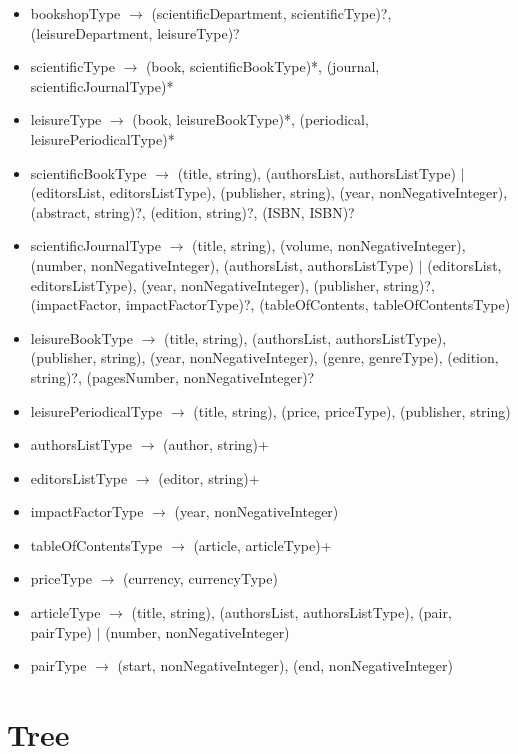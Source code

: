 \documentclass{article}
\begin{document}
\begin{itemize}
    \item bookshopType $\to$ (scientificDepartment, scientificType)?, (leisureDepartment, leisureType)?

    \item scientificType $\to$ (book, scientificBookType)*, (journal, scientificJournalType)*
    \item leisureType $\to$ (book, leisureBookType)*, (periodical, leisurePeriodicalType)*

    \item scientificBookType $\to$ (title, string), (authorsList, authorsListType) $|$ (editorsList, editorsListType), (publisher, string), (year, nonNegativeInteger), (abstract, string)?, (edition, string)?, (ISBN, ISBN)?
    \item scientificJournalType $\to$ (title, string), (volume, nonNegativeInteger), (number, nonNegativeInteger), (authorsList, authorsListType) $|$ (editorsList, editorsListType), (year, nonNegativeInteger), (publisher, string)?, (impactFactor, impactFactorType)?, (tableOfContents, tableOfContentsType)
    \item leisureBookType $\to$ (title, string), (authorsList, authorsListType), (publisher, string), (year, nonNegativeInteger), (genre, genreType), (edition, string)?, (pagesNumber, nonNegativeInteger)?
    \item leisurePeriodicalType $\to$ (title, string), (price, priceType), (publisher, string)

    \item authorsListType $\to$ (author, string)+
    \item editorsListType $\to$ (editor, string)+
    \item impactFactorType $\to$ (year, nonNegativeInteger)
    \item tableOfContentsType $\to$ (article, articleType)+
    \item priceType $\to$ (currency, currencyType)

    \item articleType $\to$ (title, string), (authorsList, authorsListType), (pair, pairType) $|$ (number, nonNegativeInteger)

    \item pairType $\to$ (start, nonNegativeInteger), (end, nonNegativeInteger)

\end{itemize}


\section{Tree}
\end{document}

